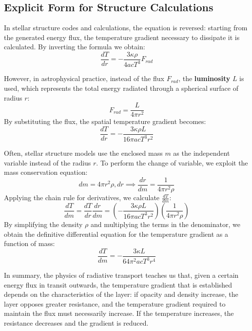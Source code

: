 \subsection{Explicit Form for Structure Calculations}

In stellar structure codes and calculations, the equation is reversed: starting from the generated energy flux, the temperature gradient necessary to dissipate it is calculated. By inverting the formula we obtain:
\begin{equation}
\frac{dT}{dr} = - \frac{3 \kappa \rho}{4 a c T^3} F_{rad}
\end{equation}

However, in astrophysical practice, instead of the flux $F_{rad}$, the \textbf{luminosity} $L$ is used, which represents the total energy radiated through a spherical surface of radius $r$:
\begin{equation}
F_{rad} = \frac{L}{4 \pi r^2}
\end{equation}
By substituting the flux, the spatial temperature gradient becomes:
\begin{equation}
\frac{dT}{dr} = - \frac{3 \kappa \rho L}{16 \pi a c T^3 r^2}
\end{equation}

Often, stellar structure models use the enclosed mass $m$ as the independent variable instead of the radius $r$. To perform the change of variable, we exploit the mass conservation equation:
\begin{equation}
dm = 4 \pi r^2 \rho , dr \implies \frac{dr}{dm} = \frac{1}{4 \pi r^2 \rho}
\end{equation}
Applying the chain rule for derivatives, we calculate $\frac{dT}{dm}$:
\begin{equation}
\frac{dT}{dm} = \frac{dT}{dr} \frac{dr}{dm} = \left( - \frac{3 \kappa \rho L}{16 \pi a c T^3 r^2} \right) \left( \frac{1}{4 \pi r^2 \rho} \right)
\end{equation}
By simplifying the density $\rho$ and multiplying the terms in the denominator, we obtain the definitive differential equation for the temperature gradient as a function of mass:
\begin{equation}
\frac{dT}{dm} = - \frac{3 \kappa L}{64 \pi^2 a c T^3 r^4}
\end{equation}

In summary, the physics of radiative transport teaches us that, given a certain energy flux in transit outwards, the temperature gradient that is established depends on the characteristics of the layer: if opacity and density increase, the layer opposes greater resistance, and the temperature gradient required to maintain the flux must necessarily increase. If the temperature increases, the resistance decreases and the gradient is reduced.

